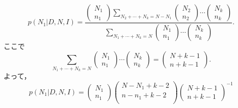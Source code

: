 \begin{equation}
  \label{A9}
  p(N_1 | D,N,I) = \frac{
    \left(
      \begin{array}{l}
        N_1 \\
        n_1
      \end{array}
    \right)
    \sum_{N_2 + \cdots + N_k = N - N_1}
    \left(
      \begin{array}{l}
        N_2 \\
        n_2
      \end{array}
    \right)
    \cdots
    \left(
      \begin{array}{l}
        N_k \\
        n_k
      \end{array}
    \right)
    }{
    \sum_{N_1 + \cdots + N_k = N}
    \left(
      \begin{array}{l}
        N_1 \\
        n_1
      \end{array}
    \right)
    \cdots
    \left(
      \begin{array}{l}
        N_k \\
        n_k
      \end{array}
    \right)
    }.
\end{equation}
ここで
\begin{equation}
  \label{A10}
  \sum_{N_1 + \cdots + N_k = N} 
  \left(
    \begin{array}{l}
      N_1 \\
      n_1
    \end{array}
  \right)
  \cdots
  \left(
    \begin{array}{l}
      N_k \\
      n_k
    \end{array}
  \right) =
  \left(
    \begin{array}{l}
      N + k - 1 \\
      n + k - 1
    \end{array}
  \right).
\end{equation}
よって，
\begin{equation}
  \label{A11}
  p(N_1 | D, N, I) =
  \left(
    \begin{array}{l}
      N_1\\
      n_1
    \end{array}
  \right)
  \left(
    \begin{array}{l}
      N - N_1 + k - 2\\
      n - n_1 + k - 2\\
    \end{array}
  \right)
  \left(
    \begin{array}{l}
      N + k - 1\\
      n + k - 1
    \end{array}
  \right)^{-1}
\end{equation}
